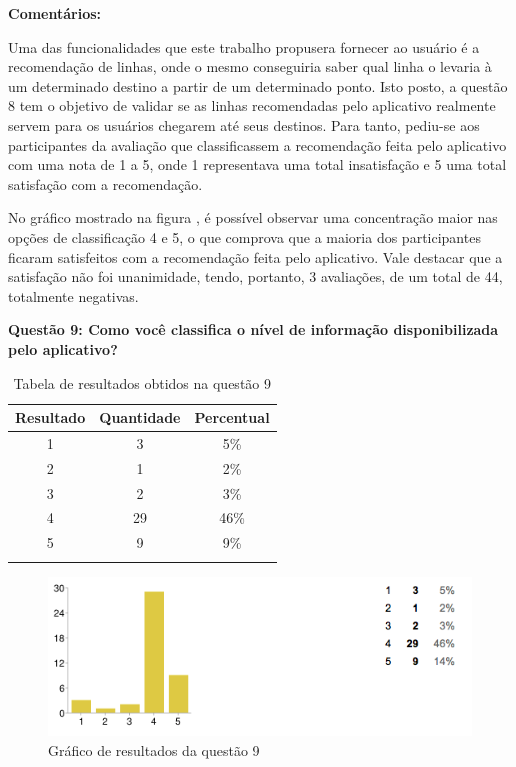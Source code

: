 \textbf{Comentários:}

Uma das funcionalidades que este trabalho propusera fornecer ao usuário é a recomendação de linhas, onde o mesmo conseguiria saber qual linha o levaria à um determinado destino a partir de um determinado ponto. Isto posto, a questão 8 tem o objetivo de validar se as linhas recomendadas pelo aplicativo realmente  servem para os usuários  chegarem até seus destinos. Para tanto, pediu-se aos participantes da avaliação que classificassem a recomendação feita pelo aplicativo com uma nota de 1 a 5, onde 1 representava uma total insatisfação e 5 uma total satisfação com a recomendação.

No gráfico mostrado na figura , é possível observar uma concentração maior nas opções de classificação 4 e 5, o que comprova que a maioria dos participantes ficaram satisfeitos com a recomendação feita pelo aplicativo. Vale destacar que a satisfação não foi unanimidade, tendo, portanto, 3 avaliações, de um total  de 44, totalmente negativas. \newline

\textbf{Questão 9: Como você classifica o nível de informação disponibilizada pelo aplicativo?}

\begin{center}
\begin{longtable}{c|c|c}
\hline
    \multicolumn{1}{c}{\textbf{Resultado}} & \multicolumn{1}{c}{\textbf{Quantidade}} & \multicolumn{1}{c}{\textbf{Percentual}} \\
\hline
    1 & 3 &  5\%\\
    \hline
    2 & 1 & 2\%\\
    \hline
    3 & 2 &  3\%\\
    \hline
    4 & 29 & 46\%\\
    \hline
    5 & 9 & 9\%\\
    \hline
\caption{Tabela de resultados obtidos na questão 9}
\label{tabq9}
\end{longtable}
\end{center}


\begin{figure}[h]
\begin{center}
  \includegraphics[width=16cm]{images/graficos/questao9.png}
  \caption{Gráfico de resultados da questão 9}
  \label{fig:questao9}
\end{center}
\end{figure}

